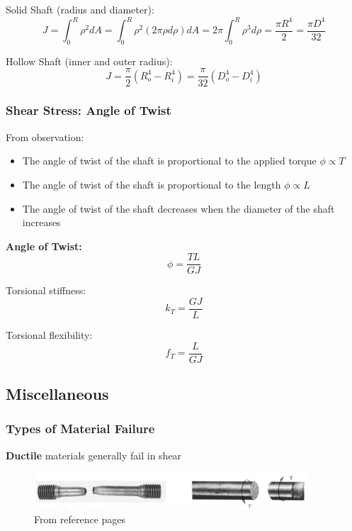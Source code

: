Solid Shaft (radius and diameter): \[J = \int_0^R{\rho^2dA} = \int_0^R{\rho^2(2\pi\rho d\rho)dA} =2\pi \int_0^R{\rho^3d\rho} = \frac{\pi R^4}{2} = \frac{\pi D^4}{32}\]

\noindent Hollow Shaft (inner and outer radius): \[J = \frac{\pi}{2}(R_o^4-R_i^4) = \frac{\pi}{32}(D_o^4-D_i^4)\]

\subsubsection{}

\noindent \textbf{}

\subsubsection{Shear Stress: Angle of Twist}
From observation:
\begin{itemize}
    \item The angle of twist of the shaft is proportional to the applied torque $\phi \propto T$
    \item The angle of twist of the shaft is proportional to the length $\phi \propto L$
    \item The angle of twist of the shaft decreases when the diameter of the shaft increases
\end{itemize}


\noindent \textbf{Angle of Twist:} \[\phi = \frac{TL}{GJ}\]

\noindent Torsional stiffness: \[k_T = \frac{GJ}{L}\]

\noindent Torsional flexibility: \[f_T = \frac{L}{GJ}\]


\subsection{Miscellaneous}
\subsubsection{Types of Material Failure}

\textbf{Ductile }materials generally fail in shear

\begin{figure}[!h]
\centering
\includegraphics[angle=0, width=4in]{Torsion-Figures/ductile.png}
\vspace{-2mm}
\caption{\small From reference pages}
\vspace{-3mm}
\label{Fig:Ductile}
\end{figure}

